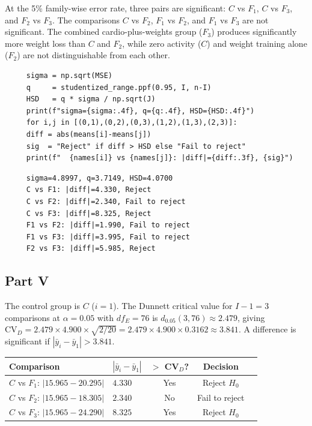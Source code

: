 \documentclass[letterpaper]{article}
\begin{document}
		At the 5\% family-wise error rate, three pairs are significant:
		$C$ vs $F_1$, $C$ vs $F_3$, and $F_2$ vs $F_3$.
		The comparisons $C$ vs $F_2$, $F_1$ vs $F_2$, and $F_1$ vs $F_3$ are not significant.
		The combined cardio-plus-weights group ($F_3$) produces significantly more weight loss than
		$C$ and $F_2$, while zero activity ($C$) and weight training alone ($F_2$) are not
		distinguishable from each other.
		
		\begin{lstlisting}
     sigma = np.sqrt(MSE)
     q     = studentized_range.ppf(0.95, I, n-I)
     HSD   = q * sigma / np.sqrt(J)
     print(f"sigma={sigma:.4f}, q={q:.4f}, HSD={HSD:.4f}")
     for i,j in [(0,1),(0,2),(0,3),(1,2),(1,3),(2,3)]:
     diff = abs(means[i]-means[j])
     sig  = "Reject" if diff > HSD else "Fail to reject"
     print(f"  {names[i]} vs {names[j]}: |diff|={diff:.3f}, {sig}")
		\end{lstlisting}
		
		\begin{minipage}{\linewidth}
			\begin{Verbatim}
     sigma=4.8997, q=3.7149, HSD=4.0700
     C vs F1: |diff|=4.330, Reject
     C vs F2: |diff|=2.340, Fail to reject
     C vs F3: |diff|=8.325, Reject
     F1 vs F2: |diff|=1.990, Fail to reject
     F1 vs F3: |diff|=3.995, Fail to reject
     F2 vs F3: |diff|=5.985, Reject
			\end{Verbatim}
		\end{minipage}
		\clearpage
		\subsection{Part V} The control group is $C$ ($i = 1$). The Dunnett critical value for
		$I - 1 = 3$ comparisons at $\alpha = 0.05$ with $df_E = 76$ is $d_{0.05}(3, 76) \approx 2.479$,
		giving $\mathrm{CV}_D = 2.479 \times 4.900 \times \sqrt{2/20} = 2.479 \times 4.900 \times 0.3162 \approx 3.841$.
		A difference is significant if $|\bar{y}_i - \bar{y}_1| > 3.841$.
		
		\begin{center}
			\begin{tabular}{llccc}
				\hline
				Comparison & $|\bar{y}_i - \bar{y}_1|$ & $>$ CV$_D$? & Decision \\
				\hline
				$C$ vs $F_1$: $|15.965 - 20.295|$ & $4.330$ & Yes & Reject $H_0$ \\
				$C$ vs $F_2$: $|15.965 - 18.305|$ & $2.340$ & No  & Fail to reject \\
				$C$ vs $F_3$: $|15.965 - 24.290|$ & $8.325$ & Yes & Reject $H_0$ \\
				\hline
			\end{tabular}
		\end{center}
		
\end{document}
